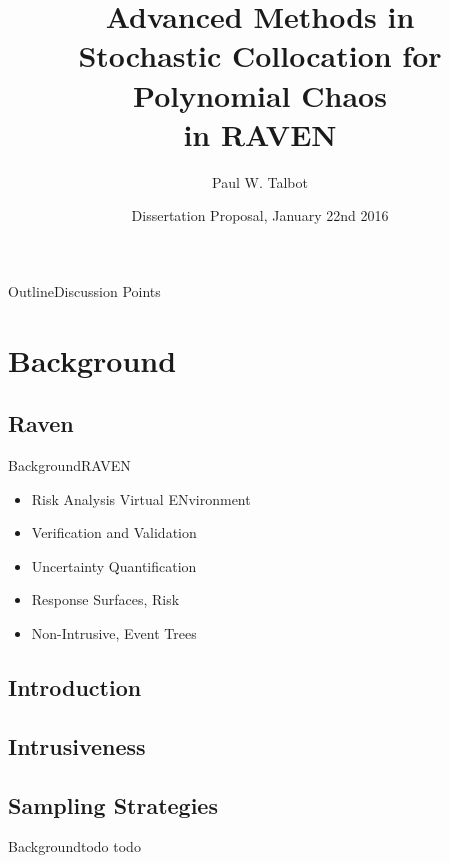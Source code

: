 \documentclass{beamer}
\title[UQ in RAVEN] %
{Advanced Methods in \\Stochastic Collocation for Polynomial Chaos\\in RAVEN}
\author[Talbot] %
{Paul W. Talbot}%
\institute[University of New Mexico] %
{
  University of New Mexico%
}
\date[Jan 22 2016] %
{Dissertation Proposal, January 22nd 2016}
\begin{document}
\begin{frame}
  \titlepage
\end{frame}


\begin{frame}{Outline}{Discussion Points}\vspace{-20pt}
  \tableofcontents[hideallsubsections]%
\end{frame}

\section{Background}

\subsection{Raven}
\begin{frame}{Background}{RAVEN}\vspace{-20pt}
  \begin{itemize}
    \item Risk Analysis Virtual ENvironment
    \item Verification and Validation
    \item Uncertainty Quantification
    \item Response Surfaces, Risk
    \item Non-Intrusive, Event Trees
  \end{itemize}
\end{frame}
\subsection{Introduction}
\subsection{Intrusiveness}
\subsection{Sampling Strategies}

\begin{frame}{Background}{todo}
  todo
\end{frame}
\end{document}
